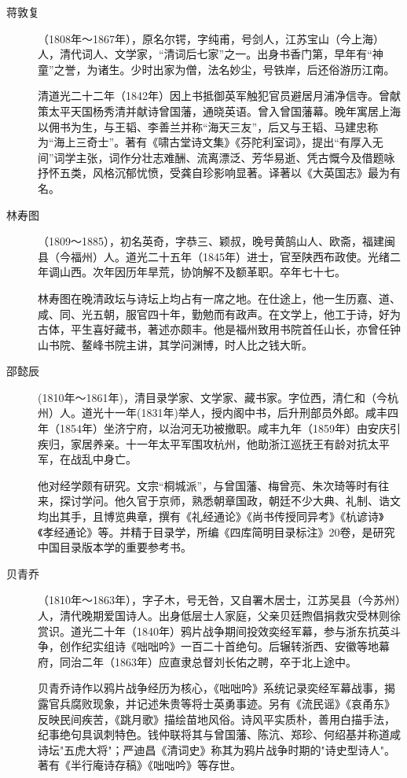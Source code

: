 \begin{description}
  \item[蒋敦复] （1808年～1867年），原名尔锷，字纯甫，号剑人，江苏宝山（今上海）人，清代词人、文学家，“清词后七家”之一。出身书香门第，早年有“神童”之誉，为诸生。少时出家为僧，法名妙尘，号铁岸，后还俗游历江南。\par
        清道光二十二年（1842年）因上书抵御英军触犯官员避居月浦净信寺。曾献策太平天国杨秀清并献诗曾国藩，通晓英语。曾入曾国藩幕。晚年寓居上海以佣书为生，与王韬、李善兰并称“海天三友”，后又与王韬、马建忠称为“海上三奇士”。著有《啸古堂诗文集》《芬陀利室词》，提出“有厚入无间”词学主张，词作分壮志难酬、流离漂泛、芳华易逝、凭古慨今及借题咏抒怀五类，风格沉郁忧愤，受龚自珍影响显著。译著以《大英国志》最为有名。
  \item[林寿图] （1809～1885），初名英奇，字恭三、颖叔，晚号黄鹄山人、欧斋，福建闽县（今福州）人。道光二十五年（1845年）进士，官至陕西布政使。光绪二年调山西。次年因历年旱荒，协饷解不及额革职。卒年七十七。\par
        林寿图在晚清政坛与诗坛上均占有一席之地。在仕途上，他一生历嘉、道、咸、同、光五朝，服官四十年，勤勉而有政声。在文学上，他工于诗，好为古体，平生喜好藏书，著述亦颇丰。他是福州致用书院首任山长，亦曾任钟山书院、鳌峰书院主讲，其学问渊博，时人比之钱大昕。
  \item[邵懿辰] (1810年～1861年)，清目录学家、文学家、藏书家。字位西，清仁和（今杭州）人。道光十一年(1831年)举人，授内阁中书，后升刑部员外郎。咸丰四年（1854年）坐济宁府，以治河无功被撤职。咸丰九年（1859年）由安庆引疾归，家居养亲。十一年太平军围攻杭州，他助浙江巡抚王有龄对抗太平军，在战乱中身亡。\par
        他对经学颇有研究。文宗“桐城派”，与曾国藩、梅曾亮、朱次琦等时有往来，探讨学问。他久官于京师，熟悉朝章国政，朝廷不少大典、礼制、诰文均出其手，且博览典章，撰有《礼经通论》《尚书传授同异考》《杭谚诗》《孝经通论》等。并精于目录学，所编《四库简明目录标注》20卷，是研究中国目录版本学的重要参考书。
  \item[贝青乔] （1810年～1863年），字子木，号无咎，又自署木居士，江苏吴县（今苏州）人，清代晚期爱国诗人。出身低层士人家庭，父亲贝廷煦倡捐救灾受林则徐赏识。道光二十年（1840年）鸦片战争期间投效奕经军幕，参与浙东抗英斗争，创作纪实组诗《咄咄吟》一百二十首绝句。后辗转浙西、安徽等地幕府，同治二年（1863年）应直隶总督刘长佑之聘，卒于北上途中。\par
        贝青乔诗作以鸦片战争经历为核心，《咄咄吟》系统记录奕经军幕战事，揭露官兵腐败现象，并记述朱贵等将士英勇事迹。另有《流民谣》《哀甬东》反映民间疾苦，《跳月歌》描绘苗地风俗。诗风平实质朴，善用白描手法，纪事绝句具讽刺特色。钱仲联将其与曾国藩、陈沆、郑珍、何绍基并称道咸诗坛"五虎大将"；严迪昌《清词史》称其为鸦片战争时期的"诗史型诗人"。著有《半行庵诗存稿》《咄咄吟》等存世。

\end{description}
